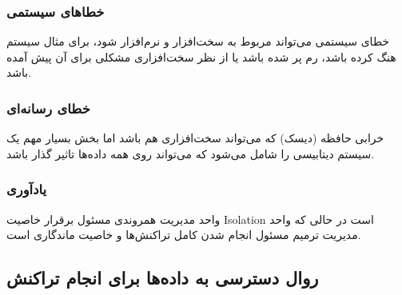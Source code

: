 \documentclass[a4paper]{article}
\begin{document}
\subsubsection{خطا‌های سیستمی}

خطای سیستمی می‌تواند مربوط به سخت‌افزار و نرم‌افزار شود، برای مثال سیستم هنگ
کرده باشد، رم پر شده باشد یا از نظر سخت‌افزاری مشکلی برای آن پیش آمده باشد.

\subsubsection{خطای رسانه‌ای}

خرابی حافظه (دیسک) که می‌تواند سخت‌افزاری هم باشد اما بخش بسیار مهم یک سیستم
دیتابیسی را شامل می‌شود که می‌تواند روی همه داده‌ها تاثیر گذار باشد.

\subsubsection*{یادآوری}

واحد مدیریت همروندی مسئول برقرار خاصیت Isolation است در حالی که واحد مدیریت
ترمیم مسئول انجام شدن کامل تراکنش‌ها و خاصیت ماندگاری است.

\subsection{روال دسترسی به داده‌ها برای انجام تراکنش}
\end{document}

